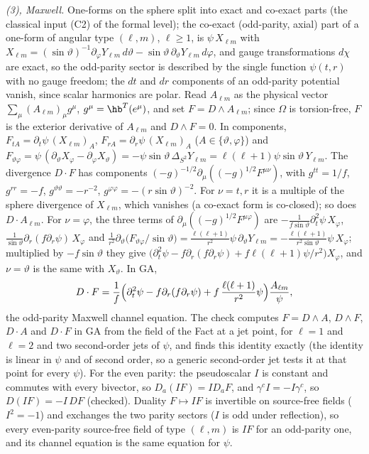 \emph{(3), Maxwell.} One-forms on the sphere split into exact and co-exact parts (the classical input (C2) of the formal level); the co-exact (odd-parity, axial) part of a one-form of angular type $(\ell, m)$, $\ell \geq 1$, is $\psi\,X_{\ell m}$ with $X_{\ell m} = (\sin\vartheta)^{-1}\partial_{\varphi}Y_{\ell m}\,d\vartheta - \sin\vartheta\,\partial_{\vartheta}Y_{\ell m}\,d\varphi$, and gauge transformations $d\chi$ are exact, so the odd-parity sector is described by the single function $\psi(t,r)$ with no gauge freedom; the $dt$ and $dr$ components of an odd-parity potential vanish, since scalar harmonics are polar. Read $A_{\ell m}$ as the physical vector $\sum_{\mu}(A_{\ell m})_{\mu}g^{\mu}$, $g^{\mu} = \hb^{T}(e^{\mu})$, and set $F = D \wedge A_{\ell m}$; since $\Omega$ is torsion-free, $F$ is the exterior derivative of $A_{\ell m}$ and $D \wedge F = 0$. In components, $F_{tA} = \partial_{t}\psi\,(X_{\ell m})_{A}$, $F_{rA} = \partial_{r}\psi\,(X_{\ell m})_{A}$ ($A \in \{\vartheta, \varphi\}$) and $F_{\vartheta\varphi} = \psi\,(\partial_{\vartheta}X_{\varphi} - \partial_{\varphi}X_{\vartheta}) = -\psi\sin\vartheta\,\Delta_{S^{2}}Y_{\ell m} = \ell(\ell+1)\psi\sin\vartheta\,Y_{\ell m}$. The divergence $D \cdot F$ has components $(-g)^{-1/2}\partial_{\mu}((-g)^{1/2}F^{\mu\nu})$, with $g^{tt} = 1/f$, $g^{rr} = -f$, $g^{\vartheta\vartheta} = -r^{-2}$, $g^{\varphi\varphi} = -(r\sin\vartheta)^{-2}$. For $\nu = t, r$ it is a multiple of the sphere divergence of $X_{\ell m}$, which vanishes (a co-exact form is co-closed); so does $D \cdot A_{\ell m}$. For $\nu = \varphi$, the three terms of $\partial_{\mu}((-g)^{1/2}F^{\mu\varphi})$ are $-\tfrac{1}{f\sin\vartheta}\partial_{t}^{2}\psi\,X_{\varphi}$, $\tfrac{1}{\sin\vartheta}\partial_{r}(f\partial_{r}\psi)\,X_{\varphi}$ and $\tfrac{1}{r^{2}}\partial_{\vartheta}\bigl(F_{\vartheta\varphi}/\sin\vartheta\bigr) = \tfrac{\ell(\ell+1)}{r^{2}}\psi\,\partial_{\vartheta}Y_{\ell m} = -\tfrac{\ell(\ell+1)}{r^{2}\sin\vartheta}\psi\,X_{\varphi}$; multiplied by $-f\sin\vartheta$ they give $\bigl(\partial_{t}^{2}\psi - f\partial_{r}(f\partial_{r}\psi) + f\ell(\ell+1)\psi/r^{2}\bigr)X_{\varphi}$, and $\nu = \vartheta$ is the same with $X_{\vartheta}$. In GA,
\[
D \cdot F = \frac{1}{f}\Bigl(\partial_{t}^{2}\psi - f\partial_{r}(f\partial_{r}\psi) + f\,\frac{\ell(\ell+1)}{r^{2}}\psi\Bigr)\frac{A_{\ell m}}{\psi},
\]
the odd-parity Maxwell channel equation. The check computes $F = D \wedge A$, $D \wedge F$, $D \cdot A$ and $D \cdot F$ in GA from the field of the Fact at a jet point, for $\ell = 1$ and $\ell = 2$ and two second-order jets of $\psi$, and finds this identity exactly (the identity is linear in $\psi$ and of second order, so a generic second-order jet tests it at that point for every $\psi$). For the even parity: the pseudoscalar $I$ is constant and commutes with every bivector, so $D_{a}(IF) = I D_{a}F$, and $\gamma^{c}I = -I\gamma^{c}$, so $D(IF) = -I\,DF$ (checked). Duality $F \mapsto IF$ is invertible on source-free fields ($I^{2} = -1$) and exchanges the two parity sectors ($I$ is odd under reflection), so every even-parity source-free field of type $(\ell, m)$ is $IF$ for an odd-parity one, and its channel equation is the same equation for $\psi$.

